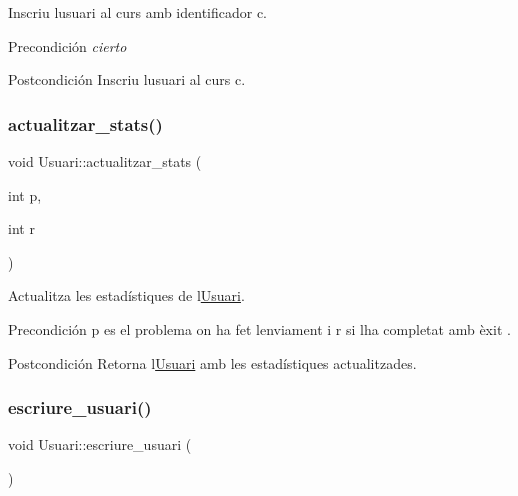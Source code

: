 Inscriu l\textquotesingle{}usuari al curs amb identificador c. 

\begin{DoxyPrecond}{Precondición}
{\itshape cierto} 
\end{DoxyPrecond}
\begin{DoxyPostcond}{Postcondición}
Inscriu l\textquotesingle{}usuari al curs c. 
\end{DoxyPostcond}
\mbox{\label{class_usuari_ab47d77ad6eb5d9139f464c226fca2af4}} 
\subsubsection{\texorpdfstring{actualitzar\+\_\+stats()}{actualitzar\_stats()}}
{\footnotesize\ttfamily void Usuari\+::actualitzar\+\_\+stats (\begin{DoxyParamCaption}\item[{int}]{p,  }\item[{int}]{r }\end{DoxyParamCaption})}



Actualitza les estadístiques de l\textquotesingle{}\mbox{\hyperlink{class_usuari}{Usuari}}. 

\begin{DoxyPrecond}{Precondición}
p es el problema on ha fet l\textquotesingle{}enviament i r si l\textquotesingle{}ha completat amb èxit . 
\end{DoxyPrecond}
\begin{DoxyPostcond}{Postcondición}
Retorna l\textquotesingle{}\mbox{\hyperlink{class_usuari}{Usuari}} amb les estadístiques actualitzades. 
\end{DoxyPostcond}
\mbox{\label{class_usuari_a19ce3acaf6693208eed30686bd79c30e}} 
\subsubsection{\texorpdfstring{escriure\+\_\+usuari()}{escriure\_usuari()}}
{\footnotesize\ttfamily void Usuari\+::escriure\+\_\+usuari (\begin{DoxyParamCaption}{ }\end{DoxyParamCaption})}




